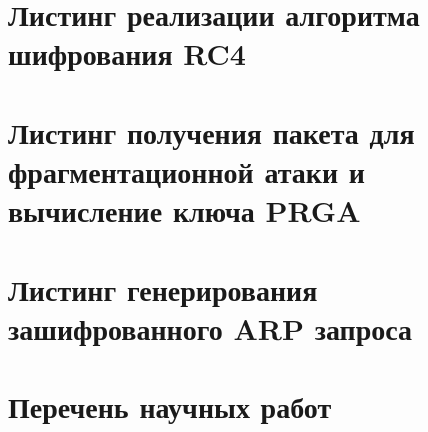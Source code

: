 \appendix
\chapter{Листинг реализации алгоритма шифрования RC4}
\label{app:rc4}
\lstset{%
    language=Python,
    breaklines=true,        %
    breakatwhitespace=false,    %
}



\chapter{Листинг получения пакета для фрагментационной атаки и вычисление
ключа PRGA}
\label{app:listing_fragmentation}

 


\chapter{Листинг генерирования зашифрованного ARP запроса}
\label{app:listing_generate_arp_packet}




\chapter{Перечень научных работ}
\label{app:list_of_articles}
